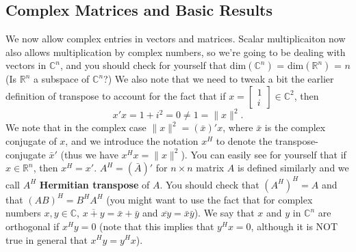 \documentclass[12pt,oneside]{article}
\begin{document}
\subsection{Complex Matrices and Basic Results}
We now allow complex entries in vectors and matrices. Scalar
multiplicaiton now also allows multiplication by complex numbers, so
we're going to be dealing with vectors in ${\mathbb{C}}^n$, and you
should check for yourself that dim$({\mathbb{C}}^n)$ =
dim$({\mathbb{R}}^n)$ = $n$ (Is $\mathbb{R}^n$ a subspace of
$\mathbb{C}^n$?) We also note that we need to tweak a bit the earlier
definition of transpose to account for the fact that if $x = \left[
  \begin{array} {c} 1 \\ i \end{array} \right] \in {\mathbb{C}}^2$,
then $$x'x = 1 + i^2 = 0 \neq 1 = \|x\|^2.$$ We note that in the complex
case $\|x\|^2 = (\bar{x})'x$, where $\bar{x}$ is the complex conjugate
of $x$, and we introduce the notation $x^H$ to denote the
transpose-conjugate $\bar{x}'$ (thus we have $x^H x = \|x\|^2$). You
can easily see for yourself that if $x \in \mathbb{R}^n$, then $x^H =
x'$. $A^H = (\bar{A})'$ for $n \times n$ matrix $A$ is defined
similarly and we call $A^H$ \textbf{Hermitian transpose} of $A$. You
should check that $(A^H)^H = A$ and  that $(AB)^H = B^H A^H$ (you might want to
use the fact that for complex numbers $x, y \in \mathbb{C}$, $\overline{x +
  y} = \bar{x} + \bar{y}$ and $\overline{x y} = \bar{x} \bar{y}$).  We say
that $x$ and $y$ in $\mathbb{C}^n$ are orthogonal if $x^H y = 0$ (note
that this implies that $y^H x = 0$, although it is NOT true in general
that $x^H y = y^H x$).
\end{document}
